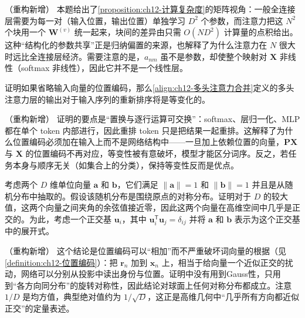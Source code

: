 \documentclass[../../main.tex]{subfiles}
\begin{document}
\begin{remark}（重构新增）
本题给出了\cref{proposition:ch12-计算复杂度}的矩阵视角：一般全连接层需要为每一对（输入位置，输出位置）单独学习 $D^{2}$ 个参数，而注意力把这 $N^{2}$ 个块用一个 $\mathbf{W}^{(v)}$ 统一起来，块间的差异由只需 $O(ND^{2})$ 计算量的点积给出。这种“结构化的参数共享”正是归纳偏置的来源，也解释了为什么注意力在 $N$ 很大时远比全连接层经济。需要注意的是，$a_{nm}$ 虽不是参数，却使整个映射对 $\mathbf{X}$ 非线性（softmax 非线性），因此它并不是一个线性层。
\end{remark}

\begin{exercise}[（$\star$）]\label{exercise:ch12-07}
证明如果省略输入向量的位置编码，那么\eqref{align:ch12-多头注意力合并}定义的多头注意力层的输出对于输入序列的重新排序将是等变化的。
\end{exercise}

\begin{remark}（重构新增）
证明的要点是“置换与逐行运算可交换”：softmax、层归一化、MLP 都在单个 token 内部进行，因此重排 token 只是把结果一起重排。这解释了为什么位置编码必须加在输入上而不是网络结构中——一旦加上依赖位置的向量，$\mathbf{P}\mathbf{X}$ 与 $\mathbf{X}$ 的位置编码不再对应，等变性被有意破坏，模型才能区分词序。反之，若任务本身与顺序无关（如集合上的分类），保持等变性反而是优点。
\end{remark}

\begin{exercise}\label{exercise:ch12-08}
考虑两个 $D$ 维单位向量 $\mathbf{a}$ 和 $\mathbf{b}$，它们满足 $\|\mathbf{a}\|=1$ 和 $\|\mathbf{b}\|=1$ 并且是从随机分布中抽取的。假设该随机分布是围绕原点的对称分布。证明对于 $D$ 的较大值，这两个向量之间夹角的余弦值接近零，因此这两个向量在高维空间中几乎是正交的。为此，考虑一个正交基 $\mathbf{u}_i$，其中 $\mathbf{u}_i^{\mathsf{T}}\mathbf{u}_j=\delta_{ij}$ 并将 $\mathbf{a}$ 和 $\mathbf{b}$ 表示为这个正交基中的展开式。
\end{exercise}

\begin{remark}（重构新增）
这个结论是位置编码可以“相加”而不严重破坏词向量的根据（见\cref{definition:ch12-位置编码}）：把 $\mathbf{r}_n$ 加到 $\mathbf{x}_n$ 上，相当于给向量一个近似正交的扰动，网络可以分别从投影中读出身份与位置。证明中没有用到Gauss性，只用到“各方向同分布”的旋转对称性，因此结论对球面上任何对称分布都成立。注意 $1/D$ 是均方值，典型绝对值约为 $1/\sqrt{D}$，这正是高维几何中“几乎所有方向都近似正交”的定量表述。
\end{remark}
\end{document}
